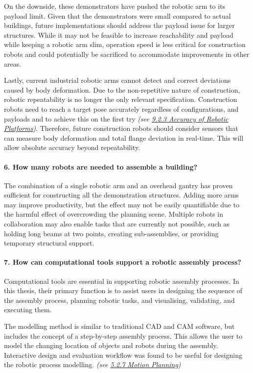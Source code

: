 On the downside, these demonstrators have pushed the robotic arm to its payload limit. Given that the demonstrators were small compared to actual buildings, future implementations should address the payload issue for larger structures. While it may not be feasible to increase reachability and payload while keeping a robotic arm slim, operation speed is less critical for construction robots and could potentially be sacrificed to accommodate improvements in other areas.

Lastly, current industrial robotic arms cannot detect and correct deviations caused by body deformation. Due to the non-repetitive nature of construction, robotic repeatability is no longer the only relevant specification. Construction robots need to reach a target pose accurately regardless of configurations, and payloads and to achieve this on the first try \textit{(see \ul{9.2.3 Accuracy of Robotic Platforms})}. Therefore, future construction robots should consider sensors that can measure body deformation and total flange deviation in real-time. This will allow absolute accuracy beyond repeatability. 

\paragraph{6. How many robots are needed to assemble a building?}

The combination of a single robotic arm and an overhead gantry has proven sufficient for constructing all the demonstration structures. Adding more arms may improve productivity, but the effect may not be easily quantifiable due to the harmful effect of overcrowding the planning scene. Multiple robots in collaboration may also enable tasks that are currently not possible, such as holding long beams at two points, creating sub-assemblies, or providing temporary structural support.

\paragraph{7. How can computational tools support a robotic assembly process?}

Computational tools are essential in supporting robotic assembly processes. In this thesis, their primary function is to assist users in designing the sequence of the assembly process, planning robotic tasks, and visualising, validating, and executing them. 

The modelling method is similar to traditional CAD and CAM software, but includes the concept of a step-by-step assembly process. This allows the user to model the changing location of objects and robots during the assembly. Interactive design and evaluation workflow was found to be useful for designing the robotic process modelling. \textit{(see \ul{5.2.7 Motion Planning})}

